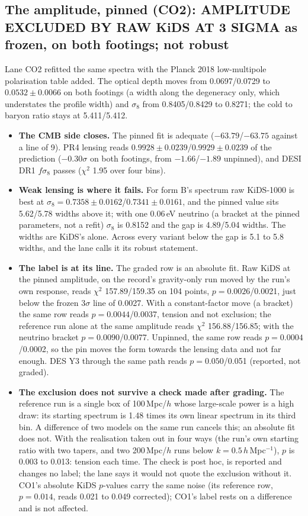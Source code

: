 \documentclass[10pt]{article}
\begin{document}
\subsection{The amplitude, pinned (CO2): AMPLITUDE EXCLUDED BY RAW KiDS AT 3 SIGMA as frozen, on both footings; not robust}
Lane CO2 refitted the same spectra with the Planck 2018 low-multipole polarisation table added. The optical depth moves from 0.0697/0.0729 to $0.0532\pm0.0066$ on both footings (a width along the degeneracy only, which understates the profile width) and $\sigma_8$ from 0.8405/0.8429 to 0.8271; the cold to baryon ratio stays at 5.411/5.412.
\begin{itemize}
\item \textbf{The CMB side closes.} The pinned fit is adequate ($-63.79$/$-63.75$ against a line of 9). PR4 lensing reads $0.9928\pm0.0239$/$0.9929\pm0.0239$ of the prediction ($-0.30\sigma$ on both footings, from $-1.66$/$-1.89$ unpinned), and DESI DR1 $f\sigma_8$ passes ($\chi^2$ 1.95 over four bins).
\item \textbf{Weak lensing is where it fails.} For form B's spectrum raw KiDS-1000 is best at $\sigma_8=0.7358\pm0.0162$/$0.7341\pm0.0161$, and the pinned value sits 5.62/5.78 widths above it; with one 0.06\,eV neutrino (a bracket at the pinned parameters, not a refit) $\sigma_8$ is 0.8152 and the gap is 4.89/5.04 widths. The widths are KiDS's alone. Across every variant below the gap is 5.1 to 5.8 widths, and the lane calls it its robust statement.
\item \textbf{The label is at its line.} The graded row is an absolute fit. Raw KiDS at the pinned amplitude, on the record's gravity-only run moved by the run's own response, reads $\chi^2$ 157.89/159.35 on 104 points, $p=0.0026$/0.0021, just below the frozen 3$\sigma$ line of 0.0027. With a constant-factor move (a bracket) the same row reads $p=0.0044$/0.0037, tension and not exclusion; the reference run alone at the same amplitude reads $\chi^2$ 156.88/156.85; with the neutrino bracket $p=0.0090$/0.0077. Unpinned, the same row reads $p=0.0004$/0.0002, so the pin moves the form towards the lensing data and not far enough. DES Y3 through the same path reads $p=0.050$/0.051 (reported, not graded).
\item \textbf{The exclusion does not survive a check made after grading.} The reference run is a single box of 100\,Mpc/$h$ whose large-scale power is a high draw: its starting spectrum is 1.48 times its own linear spectrum in its third bin. A difference of two models on the same run cancels this; an absolute fit does not. With the realisation taken out in four ways (the run's own starting ratio with two tapers, and two 200\,Mpc/$h$ runs below $k=0.5\,h$\,Mpc$^{-1}$), $p$ is 0.003 to 0.013: tension each time. The check is post hoc, is reported and changes no label; the lane says it would not quote the exclusion without it. CO1's absolute KiDS $p$-values carry the same noise (its reference row, $p=0.014$, reads 0.021 to 0.049 corrected); CO1's label rests on a difference and is not affected.

\end{itemize}
\end{document}
